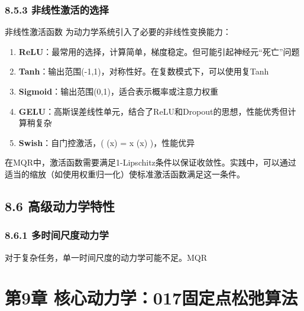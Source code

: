\documentclass[
  12pt,
]{article}
\providecommand{\tightlist}{%
  \setlength{\itemsep}{0pt}\setlength{\parskip}{0pt}}
\begin{document}
\hypertarget{ux975eux7ebfux6027ux6fc0ux6d3bux7684ux9009ux62e9}{%
\subsubsection{8.5.3
非线性激活的选择}\label{ux975eux7ebfux6027ux6fc0ux6d3bux7684ux9009ux62e9}}

非线性激活函数 \sigma 为动力学系统引入了必要的非线性变换能力：

\begin{enumerate}
\def\labelenumi{\arabic{enumi}.}
\tightlist
\item
  \textbf{ReLU}：最常用的选择，计算简单，梯度稳定。但可能引起神经元``死亡''问题
\item
  \textbf{Tanh}：输出范围(-1,1)，对称性好。在复数模式下，可以使用复Tanh
\item
  \textbf{Sigmoid}：输出范围(0,1)，适合表示概率或注意力权重
\item
  \textbf{GELU}：高斯误差线性单元，结合了ReLU和Dropout的思想，性能优秀但计算稍复杂
\item
  \textbf{Swish}：自门控激活，( (x) = x
  \cdot {}(x) )，性能优异
\end{enumerate}

在MQR中，激活函数需要满足1-Lipschitz条件以保证收敛性。实践中，可以通过适当的缩放（如使用权重归一化）使标准激活函数满足这一条件。

\hypertarget{ux9ad8ux7ea7ux52a8ux529bux5b66ux7279ux6027}{%
\subsection{8.6
高级动力学特性}\label{ux9ad8ux7ea7ux52a8ux529bux5b66ux7279ux6027}}

\hypertarget{ux591aux65f6ux95f4ux5c3aux5ea6ux52a8ux529bux5b66}{%
\subsubsection{8.6.1
多时间尺度动力学}\label{ux591aux65f6ux95f4ux5c3aux5ea6ux52a8ux529bux5b66}}

对于复杂任务，单一时间尺度的动力学可能不足。MQR

\hypertarget{ux7b2c9ux7ae0-ux6838ux5fc3ux52a8ux529bux5b66017ux56faux5b9aux70b9ux677eux5f1bux7b97ux6cd5}{%
\section{第9章
核心动力学：017固定点松弛算法}\label{ux7b2c9ux7ae0-ux6838ux5fc3ux52a8ux529bux5b66017ux56faux5b9aux70b9ux677eux5f1bux7b97ux6cd5}}
\end{document}
